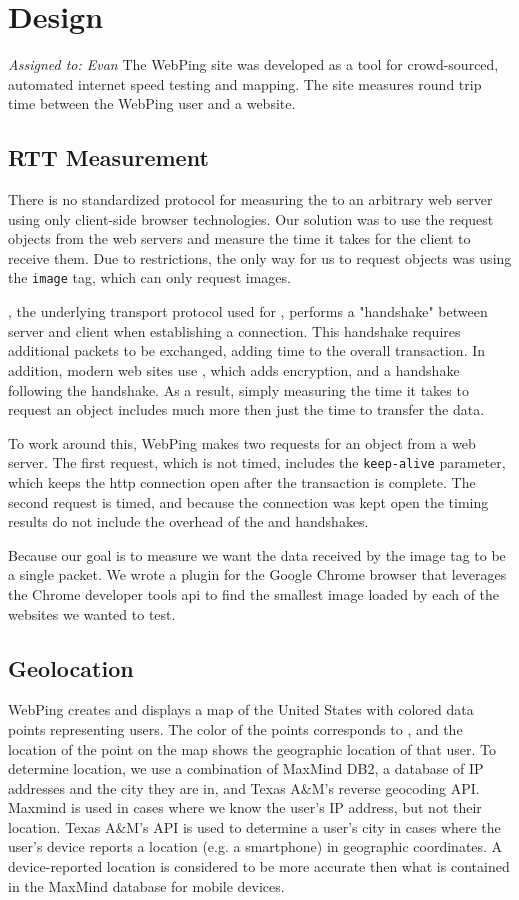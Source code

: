 \section{Design}\label{sec:design_web_ping}
\textit{Assigned to: Evan}
The WebPing site was developed as a tool for crowd-sourced, automated internet speed testing and mapping. The site measures round trip time between the WebPing user and a website. 

\subsection{RTT Measurement}
There is no standardized protocol for measuring the \rtt to an arbitrary web server using only client-side browser technologies. Our solution was to use the request objects from the web servers and measure the time it takes for the client to receive them. Due to \cors restrictions, the only way for us to request objects was using the \html \texttt{image} tag, which can only request images.

\TCP, the underlying transport protocol used for \http, performs a "handshake" between server and client when establishing a connection. This handshake requires additional packets to be exchanged, adding time to the overall transaction. In addition, modern web sites use \httpse, which adds \tls encryption, and a \tls handshake following the \tcp handshake. As a result, simply measuring the time it takes to request an object includes much more then just the time to transfer the data.

To work around this, WebPing makes two requests for an object from a web server. The first request, which is not timed, includes the \http \texttt{keep-alive} parameter, which keeps the http connection open after the transaction is complete. The second request is timed, and because the connection was kept open the timing results do not include the overhead of the \tcp and \tls handshakes.

Because our goal is to measure \rtt we want the data received by the image tag to be a single packet. We wrote a plugin for the Google Chrome browser that leverages the Chrome developer tools api to find the smallest image loaded by each of the websites we wanted to test.

\subsection{Geolocation}
WebPing creates and displays a map of the United States with colored data points representing users. The color of the points corresponds to \rtt, and the location of the point on the map shows the geographic location of that user. To determine location, we use a combination of MaxMind DB2, a database of IP addresses and the city they are in, and Texas A\&M's reverse geocoding API. Maxmind is used in cases where we know the user's IP address, but not their location. Texas A\&M's API is used to determine a user's city in cases where the user's device reports a location (e.g. a smartphone) in geographic coordinates. A device-reported location is considered to be more accurate then what is contained in the MaxMind database for mobile devices.

